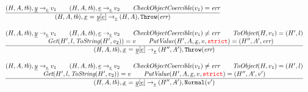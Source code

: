 \documentclass[a4paper, leqno]{amsart}
\newcommand{\rulesep}{\quad\quad}
\newcommand{\stmt}{s}
\newcommand{\expr}{e}
\newcommand{\ir}[1]{\ensuremath{\underline{#1}}}
\newcommand{\irid}{\ir{x}}
\def\inred{\color{red}}
\newcommand{\strict}{{\inred\tt strict}}
\newcommand{\tb}{\emph{tb}}
\newcommand{\err}{\emph{err}}
\newcommand{\hf}[1]{\emph{#1}}
\newcommand{\error}{\ensuremath{{\tt Throw}(\err)}}
\newcommand{\state}{\ensuremath{(H,A,\tb)}}
\newcommand{\res}{\ensuremath{(H,A)}}
\newcommand{\evale}{\ensuremath{(H,A,\tb)}}
\def\inred{\color{red}}
\begin{document}
\[\begin{array}{l@{~~}l@{~~}ll}
\frac{\begin{matrix}
\evale, \ir{y} \rightarrow_{\ir\expr} v_1
\rulesep
\evale, \ir\expr \rightarrow_{\ir\expr} v_2
\rulesep
\hf{CheckObjectCoercible}(v_1) = \err
\end{matrix}}{\begin{matrix}
\state, \irid \ {\tt=} \ \ir{y}{\tt[}\ir\expr{\tt]} \rightarrow_{\ir\stmt}
\res, \error
\end{matrix}}
\\[2em]

\frac{\begin{matrix}
\evale, \ir{y} \rightarrow_{\ir\expr} v_1
\rulesep
\evale, \ir\expr \rightarrow_{\ir\expr} v_2
\rulesep
\hf{CheckObjectCoercible}(v_1) \not= \err
\rulesep
\hf{ToObject}(H, v_1) = (H',l)
\\
\rulesep
\hf{Get}(H', l, \hf{ToString}(H', v_2)) = v
\rulesep
\hf{PutValue}(H',A,\irid,v,\strict) = (H'',A',\err)
\end{matrix}}{\begin{matrix}
\state, \irid \ {\tt=} \ \ir{y}{\tt[}\ir\expr{\tt]} \rightarrow_{\ir\stmt}
(H'',A'), \error
\end{matrix}}
\\[2em]

\frac{\begin{matrix}
\evale, \ir{y} \rightarrow_{\ir\expr} v_1
\rulesep
\evale, \ir\expr \rightarrow_{\ir\expr} v_2
\rulesep
\hf{CheckObjectCoercible}(v_1) \not= \err
\rulesep
\hf{ToObject}(H, v_1) = (H',l)
\\
\hf{Get}(H', l, \hf{ToString}(H', v_2)) = v
\rulesep
\hf{PutValue}(H',A,\irid,v,\strict) = (H'',A',v')
\end{matrix}}{\begin{matrix}
\state, \irid \ {\tt=} \ \ir{y}{\tt[}\ir\expr{\tt]} \rightarrow_{\ir\stmt}
(H'',A'), {\tt Normal}(v')
\end{matrix}}
\\[2em]
\end{array}
\]
\end{document}
